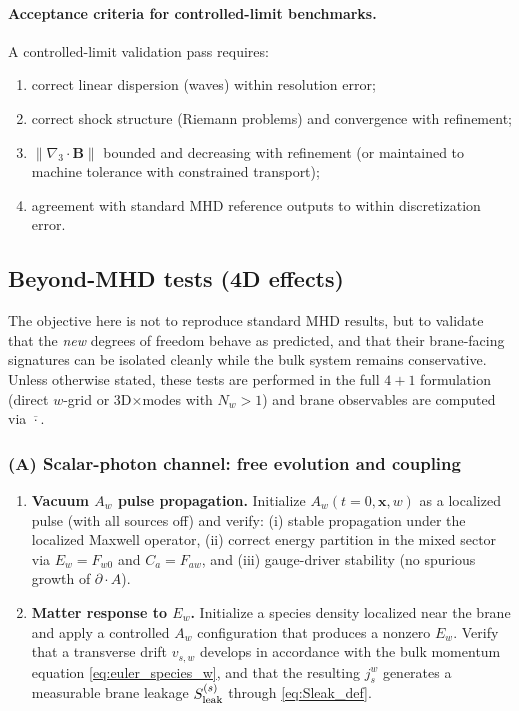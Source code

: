 \documentclass[11pt]{article}
\newcommand{\x}{\mathbf{x}}     %
\newcommand{\gradthree}{\nabla_3}
\newcommand{\Proj}[1]{\overline{#1}} %
\newcommand{\B}{\mathbf{B}}
\newcommand{\Sleak}{S_{\rm leak}}
\begin{document}
\paragraph{Acceptance criteria for controlled-limit benchmarks.}
A controlled-limit validation pass requires:
\begin{enumerate}[leftmargin=1.6em]
\item correct linear dispersion (waves) within resolution error;
\item correct shock structure (Riemann problems) and convergence with refinement;
\item \(\|\gradthree\cdot\B\|\) bounded and decreasing with refinement (or maintained
to machine tolerance with constrained transport);
\item agreement with standard MHD reference outputs to within discretization error.
\end{enumerate}

\subsection{Beyond-MHD tests (4D effects)}
\label{sec:validation_beyond}

The objective here is not to reproduce standard MHD results, but to validate that
the \emph{new} degrees of freedom behave as predicted, and that their brane-facing
signatures can be isolated cleanly while the bulk system remains conservative.
Unless otherwise stated, these tests are performed in the full \(4+1\) formulation
(direct \(w\)-grid or \(3\)D\(\times\)modes with \(N_w>1\)) and brane observables are
computed via \(\Proj{\cdot}\).

\subsubsection*{(A) Scalar-photon channel: free evolution and coupling}
\begin{enumerate}[leftmargin=1.6em]
\item \textbf{Vacuum \(A_w\) pulse propagation.}
Initialize \(A_w(t=0,\x,w)\) as a localized pulse (with all sources off) and verify:
(i) stable propagation under the localized Maxwell operator,
(ii) correct energy partition in the mixed sector via \(E_w=F_{w0}\) and
\(C_a=F_{aw}\), and
(iii) gauge-driver stability (no spurious growth of \(\partial\!\cdot\!A\)).

\item \textbf{Matter response to \(E_w\).}
Initialize a species density localized near the brane and apply a controlled \(A_w\)
configuration that produces a nonzero \(E_w\). Verify that a transverse drift
\(v_{s,w}\) develops in accordance with the bulk momentum equation
\eqref{eq:euler_species_w}, and that the resulting \(j_s^w\) generates a measurable
brane leakage \(\Sleak^{(s)}\) through \eqref{eq:Sleak_def}.
\end{enumerate}
\end{document}
